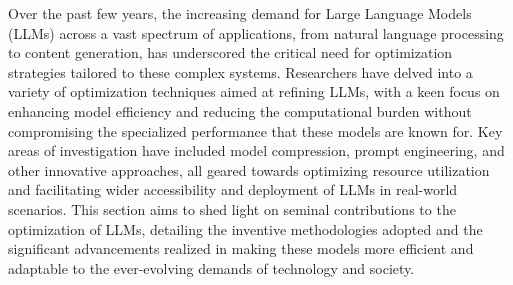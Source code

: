    Over the past few years, the increasing demand for Large Language Models (LLMs) across a vast spectrum of applications, from natural language processing to content generation, has underscored the critical need for optimization strategies tailored to these complex systems. Researchers have delved into a variety of optimization techniques aimed at refining LLMs, with a keen focus on enhancing model efficiency and reducing the computational burden without compromising the specialized performance that these models are known for. 
    Key areas of investigation have included model compression, prompt engineering, and other innovative approaches, all geared towards optimizing resource utilization and facilitating wider accessibility and deployment of LLMs in real-world scenarios. This section aims to shed light on seminal contributions to the optimization of LLMs, detailing the inventive methodologies adopted and the significant advancements realized in making these models more efficient and adaptable to the ever-evolving demands of technology and society.
    
    
